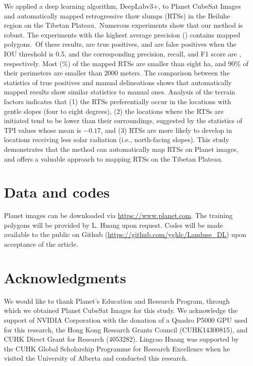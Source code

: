 \documentclass[authoryear,preprint,review,12pt]{elsarticle}
\begin{document}
We applied a deep learning algorithm, DeepLabv3+, to Planet CubeSat Images and automatically mapped retrogressive thaw slumps (RTSs) in the Beiluhe region on the Tibetan Plateau.~Numerous experiments show that our method is robust. The experiments with the highest average precision () contains  mapped polygons.~Of these  results,  are true positives, and  are false positives when the IOU threshold is 0.5, and the corresponding precision, recall, and F1 score are , respectively. Most (\%) of the mapped RTSs are smaller than eight ha, and 90\% of their perimeters are smaller than 2000 meters. The comparison between the statistics of true positives and manual delineations shows that automatically mapped results show similar statistics to manual ones. Analysis of the terrain factors indicates that (1) the RTSs preferentially occur in the locations with gentle slopes (four to eight degrees), (2) the locations where the RTSs are initiated tend to be lower than their surroundings, suggested by the statistics of TPI values whose mean is $-0.17$, and (3) RTSs are more likely to develop in locations receiving less solar radiation (i.e., north-facing slopes). This study demonstrates that the method can automatically map RTSs on Planet images, and offers a valuable approach to mapping RTSs on the Tibetan Plateau.
 

\section{Data and codes}
\label{sec_data_codes}

Planet images can be downloaded via \url{https://www.planet.com}. The training polygons will be provided by L. Huang upon request. 
Codes will be made available to the public on Github (\url{https://github.com/yghlc/Landuse\_DL}) upon acceptance of the article. 


\section{Acknowledgments}
\label{sec_acknowledgments}

We would like to thank Planet’s Education and Research Program, through which we obtained Planet CubeSat Images for this study. We acknowledge the support of NVIDIA Corporation with the donation of a Quadro P5000 GPU used for this research, the Hong Kong Research Grants Council (CUHK14300815), and CUHK Direct Grant for Research (4053282). Lingcao Huang was supported by the CUHK Global Scholarship Programme for Research Excellence when he visited the University of Alberta and conducted this research.
\end{document}

